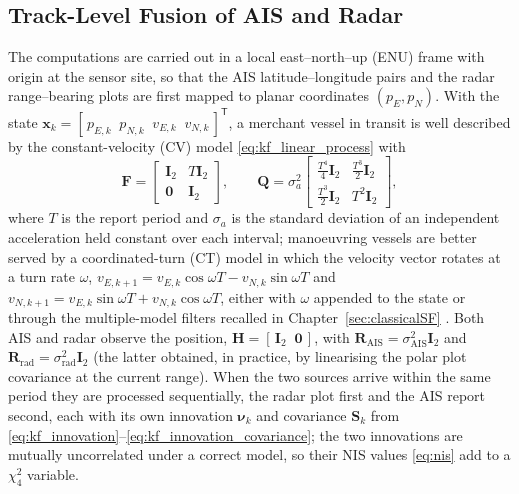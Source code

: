 \subsection{Track-Level Fusion of AIS and Radar}
\label{subsec:ais-radar-track-fusion}
The computations are carried out in a local east--north--up (ENU) frame with origin at the sensor site, so that the AIS latitude--longitude pairs and the radar range--bearing plots are first mapped to planar coordinates $(p_E,p_N)$. With the state $\mathbf{x}_k=[\,p_{E,k}\;\;p_{N,k}\;\;v_{E,k}\;\;v_{N,k}\,]^{\mathsf T}$, a merchant vessel in transit is well described by the constant-velocity (CV) model \eqref{eq:kf_linear_process} with
\begin{equation}
\mathbf{F}=
\begin{bmatrix}
\mathbf{I}_2 & T\mathbf{I}_2\\ \mathbf{0} & \mathbf{I}_2
\end{bmatrix},
\qquad
\mathbf{Q}=\sigma_a^{2}
\begin{bmatrix}
\tfrac{T^{4}}{4}\mathbf{I}_2 & \tfrac{T^{3}}{2}\mathbf{I}_2\\[2pt]
\tfrac{T^{3}}{2}\mathbf{I}_2 & T^{2}\mathbf{I}_2
\end{bmatrix},
\label{eq:ch07-cv-model}
\end{equation}
where $T$ is the report period and $\sigma_a$ is the standard deviation of an independent acceleration held constant over each interval; manoeuvring vessels are better served by a coordinated-turn (CT) model in which the velocity vector rotates at a turn rate $\omega$, $v_{E,k+1}=v_{E,k}\cos\omega T-v_{N,k}\sin\omega T$ and $v_{N,k+1}=v_{E,k}\sin\omega T+v_{N,k}\cos\omega T$, either with $\omega$ appended to the state or through the multiple-model filters recalled in Chapter~\ref{sec:classicalSF} \cite{barshalom2001_estimation}. Both AIS and radar observe the position, $\mathbf{H}=[\,\mathbf{I}_2\;\;\mathbf{0}\,]$, with $\mathbf{R}_{\mathrm{AIS}}=\sigma_{\mathrm{AIS}}^{2}\mathbf{I}_2$ and $\mathbf{R}_{\mathrm{rad}}=\sigma_{\mathrm{rad}}^{2}\mathbf{I}_2$ (the latter obtained, in practice, by linearising the polar plot covariance at the current range). When the two sources arrive within the same period they are processed sequentially, the radar plot first and the AIS report second, each with its own innovation $\boldsymbol{\nu}_k$ and covariance $\mathbf{S}_k$ from \eqref{eq:kf_innovation}--\eqref{eq:kf_innovation_covariance}; the two innovations are mutually uncorrelated under a correct model, so their NIS values \eqref{eq:nis} add to a $\chi^{2}_{4}$ variable.

